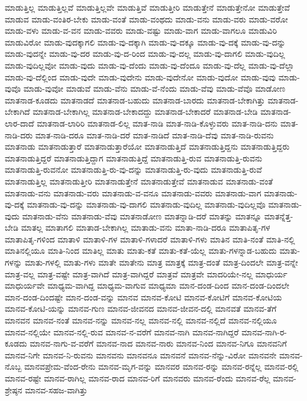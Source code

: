 {ಮಾಡುತ್ತಿಲ್ಲ
ಮಾಡುತ್ತಿಲ್ಲವೆ
ಮಾಡುತ್ತಿಲ್ಲವೇ
ಮಾಡುತ್ತಿವೆ
ಮಾಡುತ್ತೀರಿ
ಮಾಡುತ್ತೇನೆ
ಮಾಡುತ್ತೇನೋ
ಮಾಡುತ್ತೇವೆ
ಮಾಡುವ
ಮಾಡು-ವಂತಿರ-ಬೇಕು
ಮಾಡು-ವಂತೆ
ಮಾಡು-ವಂಥದು
ಮಾಡು-ವನು
ಮಾಡು-ವರು
ಮಾಡು-ವರೋ
ಮಾಡು-ವಳು
ಮಾಡು-ವ-ವನ
ಮಾಡು-ವವರು
ಮಾಡು-ವಷ್ಟು
ಮಾಡು-ವಾಗ
ಮಾಡು-ವಾಗಲೂ
ಮಾಡುವಿರಿ
ಮಾಡುವಿರೋ
ಮಾಡು-ವುದಕ್ಕಾಗಲಿ
ಮಾಡು-ವು-ದಕ್ಕಾಗಿ
ಮಾಡು-ವು-ದಕ್ಕೂ
ಮಾಡು-ವು-ದಕ್ಕೆ
ಮಾಡು-ವು-ದನ್ನು
ಮಾಡು-ವುದನ್ನೇ
ಮಾಡು-ವು-ದರ
ಮಾಡು-ವು-ದ-ರಿಂದ
ಮಾಡು-ವು-ದಲ್ಲ
ಮಾಡು-ವು-ದಾಗಲಿ
ಮಾಡು-ವುದಿಲ್ಲ
ಮಾಡು-ವುದಿಲ್ಲವೋ
ಮಾಡು-ವುದು
ಮಾಡು-ವು-ದೆಂದು
ಮಾಡು-ವು-ದೆಂದೂ
ಮಾಡು-ವು-ದೆಲ್ಲ
ಮಾಡು-ವು-ದೆಲ್ಲಾ
ಮಾಡು-ವು-ದೆಲ್ಲಿಂದ
ಮಾಡು-ವುದೇ
ಮಾಡು-ವುದೇನು
ಮಾಡು-ವುದೇನೋ
ಮಾಡು-ವುದೋ
ಮಾಡು-ವುವು
ಮಾಡು-ವುವೊ
ಮಾಡು-ವುವೋ
ಮಾಡುವೆ
ಮಾಡು-ವೆನು
ಮಾಡು-ವೆ-ನೆಂದು
ಮಾಡು-ವೆವು
ಮಾಡು-ವೆವೊ
ಮಾಡೋಣ
ಮಾತನಾಡ-ಕೂಡದು
ಮಾತನಾಡದೆ
ಮಾತನಾಡ-ಬಹುದು
ಮಾತನಾಡ-ಬಾರದು
ಮಾತನಾಡ-ಬೇಕಾಗಿತ್ತು
ಮಾತನಾಡ-ಬೇಕಾಗಿದೆ
ಮಾತನಾಡ-ಬೇಕಾಗಿಲ್ಲ
ಮಾತನಾಡ-ಬೇಕಾದದ್ದು
ಮಾತನಾಡ-ಬೇಕಾದರೆ
ಮಾತನಾಡ-ಬೇಡಿ
ಮಾತನಾಡ-ಲಾರ-ದಾದೆ
ಮಾತನಾಡ-ಲಾರಿರಿ
ಮಾತನಾಡ-ಲಿಲ್ಲ
ಮಾತ-ನಾಡಿ
ಮಾತ-ನಾಡಿ-ಕೊಳ್ಳುವರು
ಮಾತ-ನಾಡಿ-ದನು
ಮಾತ-ನಾಡಿ-ದರು
ಮಾತ-ನಾಡಿ-ದರೂ
ಮಾತ-ನಾಡಿ-ದರೆ
ಮಾತ-ನಾಡಿದೆ
ಮಾತ-ನಾಡಿ-ದೆವು
ಮಾತ-ನಾಡಿ-ರುವನು
ಮಾತನಾಡು
ಮಾತನಾಡುತ್ತಾರೆ
ಮಾತನಾಡುತ್ತಾರೆಯೋ
ಮಾತನಾಡುತ್ತಿದೆ
ಮಾತನಾಡುತ್ತಿದ್ದನು
ಮಾತನಾಡುತ್ತಿದ್ದರು
ಮಾತನಾಡುತ್ತಿದ್ದರೆ
ಮಾತನಾಡುತ್ತಿದ್ದಾಗ
ಮಾತನಾಡುತ್ತಿದ್ದೆ
ಮಾತನಾಡುತ್ತಿ-ರುವ
ಮಾತನಾಡುತ್ತಿ-ರುವನು
ಮಾತನಾಡುತ್ತಿ-ರುವನೋ
ಮಾತನಾಡುತ್ತಿ-ರು-ವು-ದನ್ನು
ಮಾತನಾಡುತ್ತಿ-ರು-ವುದು
ಮಾತನಾಡುತ್ತಿ-ರುವೆ
ಮಾತನಾಡುತ್ತಿಲ್ಲ
ಮಾತನಾಡುತ್ತೀರಿ
ಮಾತನಾಡುತ್ತೇನೆ
ಮಾತನಾಡುತ್ತೇವೆ
ಮಾತನಾಡುವ
ಮಾತನಾಡು-ವಂತೆ
ಮಾತನಾಡು-ವನು
ಮಾತನಾಡು-ವರು
ಮಾತನಾಡು-ವ-ವನೂ
ಮಾತನಾಡು-ವವರು
ಮಾತನಾಡು-ವಾಗ
ಮಾತನಾಡು-ವು-ದಕ್ಕೆ
ಮಾತನಾಡು-ವು-ದನ್ನು
ಮಾತನಾಡು-ವು-ದಾಗಲಿ
ಮಾತನಾಡು-ವುದಿಲ್ಲ
ಮಾತನಾಡು-ವುದಿಲ್ಲವೊ
ಮಾತನಾಡು-ವುದು
ಮಾತನಾಡು-ವೆನು
ಮಾತನಾಡು-ವೆವು
ಮಾತನಾಡೋಣ
ಮಾತನ್ನಾಡಿ-ದರೆ
ಮಾತನ್ನು
ಮಾತನ್ನೂ
ಮಾತನ್ನೆತ್ತ-ಬೇಡಿ
ಮಾತಲ್ಲ
ಮಾತಾಗಲಿ
ಮಾತಾಡ-ಬೇಕಾಗಿಲ್ಲ
ಮಾತಾಡು-ವನು
ಮಾತಾ-ನಾಡಿ-ದರೂ
ಮಾತಾಪಿತೃ-ಗಳ
ಮಾತಾಪಿತೃ-ಗಳಿಂದ
ಮಾತಾಳಿ
ಮಾತಾಳಿ-ಗಳ
ಮಾತಾಳಿ-ಗಳಾದರೆ
ಮಾತಾಳಿ-ಗಳು
ಮಾತಿನ
ಮಾತಿ-ನಂತೆ
ಮಾತಿ-ನಲ್ಲಿ
ಮಾತಿನಲ್ಲಿಯೂ
ಮಾತಿ-ನಿಂದ
ಮಾತಿಲ್ಲ
ಮಾತು
ಮಾತು-ಕತೆ
ಮಾತು-ಕತೆ-ಯೆಲ್ಲ
ಮಾತು-ಗಳನ್ನಾಡ-ಬಹುದು
ಮಾತು-ಗಳನ್ನು
ಮಾತು-ಗಳಲ್ಲಿ
ಮಾತು-ಗಳು
ಮಾತೇ
ಮಾತೇನು
ಮಾತ್ರ
ಮಾತ್ರಕ್ಕೆ
ಮಾತ್ರ-ದಂತೆ
ಮಾತ್ರ-ದಿಂದಲೇ
ಮಾತ್ರ-ವನ್ನೇ
ಮಾತ್ರ-ವಲ್ಲ
ಮಾತ್ರ-ವಷ್ಟೇ
ಮಾತ್ರ-ವಾಗಿದೆ
ಮಾತ್ರ-ವಾಗಿದ್ದರೆ
ಮಾತ್ರವೆ
ಮಾತ್ರವೇ
ಮಾದರಿಯೇ-ನಲ್ಲ
ಮಾಧುರ್ಯ
ಮಾಧುರ್ಯವೇ
ಮಾಧ್ಯಮ-ವಾಗಿದ್ದ
ಮಾಧ್ಯಮ-ವಾಗುವ
ಮಾಧ್ಯಮಾ
ಮಾನ-ದಂಡ-ದಿಂದ
ಮಾನ-ದಂಡ-ದಿಂದಲೇ
ಮಾನ-ದಂಡ-ದಿಂದಷ್ಟೇ
ಮಾನ-ದಂಡ-ವನ್ನು
ಮಾನವ
ಮಾನವ-ಕೋಟಿ
ಮಾನವ-ಕೋಟಿಗೆ
ಮಾನವ-ಕೋಟಿಯ
ಮಾನವ-ಕೋಟಿ-ಯನ್ನು
ಮಾನವ-ಗುಣ
ಮಾನವ-ಜೀವನದ
ಮಾನವ-ಜೀವನ-ದಲ್ಲಿ
ಮಾನವತೆ
ಮಾನವ-ತೆಗೆ
ಮಾನವನ
ಮಾನವ-ನಂತೆ
ಮಾನವ-ನನ್ನು
ಮಾನವ-ನಲ್ಲ
ಮಾನವ-ನಲ್ಲಿ
ಮಾನವ-ನಲ್ಲಿದೆ
ಮಾನವ-ನಲ್ಲಿಯೂ
ಮಾನವ-ನಲ್ಲಿಯೇ
ಮಾನವ-ನಲ್ಲಿ-ರುವ
ಮಾನವ-ನ-ವರೆಗೆ
ಮಾನವ-ನಾಗಿ
ಮಾನವ-ನಾಗಿದ್ದರೆ
ಮಾನವ-ನಾಗಿ-ರ-ಕೂಡದು
ಮಾನವ-ನಾಗು-ವ-ವರೆಗೆ
ಮಾನವ-ನಾದ
ಮಾನವ-ನಾರು
ಮಾನವ-ನಿಂದ
ಮಾನವ-ನಿಗೂ
ಮಾನವನಿಗೆ
ಮಾನವ-ನಿಗೇ
ಮಾನವ-ನಿ-ರುವನು
ಮಾನವನು
ಮಾನವನೂ
ಮಾನವನೆ
ಮಾನವ-ನೆನ್ನು-ವಿರೋ
ಮಾನವನೇ
ಮಾನವ-ನೊಬ್ಬ
ಮಾನವಪ್ರೇಮ-ವೆಂದ-ರೇನು
ಮಾನವ-ಮೃಗ-ವನ್ನು
ಮಾನವರ
ಮಾನವ-ರನ್ನು
ಮಾನವ-ರನ್ನೆಲ್ಲ
ಮಾನವ-ರಲ್ಲಿ
ಮಾನವ-ರಷ್ಟೇ
ಮಾನವ-ರಾಗಿಲ್ಲ
ಮಾನವ-ರಾದ
ಮಾನವ-ರಿಗೆ
ಮಾನವರು
ಮಾನವ-ರೆಂದು
ಮಾನವ-ರೆಲ್ಲ
ಮಾನವ-ಶ್ರೇಷ್ಠನ
ಮಾನವ-ಸಹಜ-ವಾಗಿತ್ತು
}
